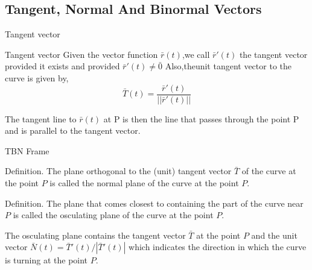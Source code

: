 \documentclass[aspectratio=169, UTF8]{ctexbeamer}
\begin{document}
\subsection{Tangent, Normal And Binormal Vectors}

\begin{frame}[t]{Tangent vector}
    \begin{block}{Tangent vector}
    Given the vector function $\bar{r}(t)$,we call $\bar{r}'(t)$ the \textcolor{yy}{tangent vector} provided it exists and provided $\bar{r}'(t) \neq \bar{0}$
    Also,the\textcolor{yy}{unit tangent vector}  to the curve is given by,
    \begin{equation*}
        \bar{T}(t) = \frac{\bar{r}'(t)}{||\bar{r}'(t)||}
    \end{equation*}
    
    The tangent line to $\bar{r}(t)$ at P
is then the line that passes through the point P and is parallel to the tangent vector.
    \end{block}
\end{frame}

\begin{frame}[t]{TBN Frame}
        \begin{block}
            \par \textcolor{yy}{Definition.} The plane orthogonal to the (unit) tangent vector $\bar{T}$ of the curve at the point $P$ is called the \textcolor{yy}{normal plane} of the curve at the point $P$.

            \phantom{zjy}

            \par \textcolor{yy}{Definition.} The plane that comes closest to containing the part of the curve near $P$ is called the \textcolor{yy}{osculating plane} of the curve at the point $P$. 
        \end{block}

        \phantom{zjy}

        \par The osculating plane contains the tangent vector $\bar{T}$ at the point $P$ and the unit vector $\bar{N} (t) = \bar{T}'(t) / |\bar{T}'(t)|$ which indicates the direction in which the curve is turning at the point $P$.
    \end{frame}
\end{document}
